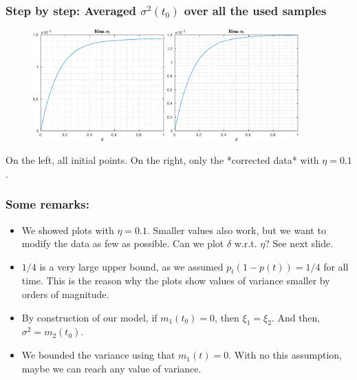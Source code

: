 \documentclass[aspectratio=169]{beamer}\usepackage[utf8]{inputenc}
\begin{document}
\begin{frame}\frametitle{Step by step: Averaged $\sigma^2(t_0)$ over all the used samples}

\begin{figure}[ht!]
\centering
\includegraphics[width=0.45\textwidth]{../../MATLAB_Files/Results/delta/Sig_0.eps}
\includegraphics[width=0.45\textwidth]{../../MATLAB_Files/Results/delta/Sig_1.eps}
\end{figure}
On the left, all initial points. On the right, only the {\color{orange}*corrected data* with $\eta=0.1$}.
\end{frame}


\begin{frame}\frametitle{Some remarks:}

\begin{itemize}

\item We showed plots with $\eta=0.1$. Smaller values also work, but we want to modify the data as few as possible. \alert{Can we plot $\delta$ w.r.t. $\eta$? See next slide.}
\item $1/4$ is a very large upper bound, as we assumed $p_t(1-p(t))=1/4$ for all time. This is the reason why the plots show values of variance smaller by orders of magnitude.
\item By construction of our model, if $m_1(t_0)=0$, then $\xi_1=\xi_2$. And then, $\sigma^2=m_2(t_0)$.
\item We bounded the variance using that $m_1(t)=0$. With no this assumption, maybe we can reach any value of variance.

\end{itemize}

\end{frame}
\end{document}
